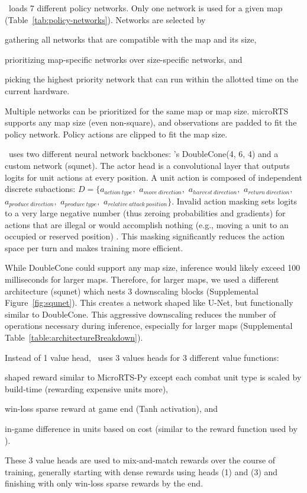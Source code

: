 \documentclass[conference]{IEEEtran}
\begin{document}
\agentName\ loads 7 different policy networks. Only one network is used
for a given map (Table~\ref{tab:policy-networks}). 
Networks are selected by
\begin{inparaenum}[(1)]
    \item gathering all networks that are compatible with the map and its size,
    \item prioritizing map-specific networks over size-specific networks, and
    \item picking the highest priority network that can run within the allotted time on
    the current hardware.
\end{inparaenum}
Multiple networks can be prioritized for the same map or map size. microRTS supports any
map size (even non-square), and 
observations are padded to fit the policy network. Policy actions are clipped to fit the
map size.

\agentName\ uses two different neural network backbones:
\cite{Ferdinand2021doublecone}'s DoubleCone(4, 6, 4) and a custom network
(squnet). The actor head is a convolutional layer
that outputs logits for unit actions at every position. A unit action is composed of
independent discrete subactions: $D = \{a_{action\ type},$ $a_{move\ direction},$ $a_{harvest\
direction},$ $a_{return\ direction},$ $a_{produce\ direction},$ $a_{produce\ type},$ $a_{relative\
attack\ position}\}$. Invalid action masking sets
logits to a very large negative number (thus zeroing probabilities and gradients) for actions that are
illegal or would accomplish nothing (e.g., moving a unit to an occupied or reserved
position) \cite{DBLP:journals/corr/abs-2006-14171}. This masking significantly reduces
the action space per turn and makes training more efficient.

While DoubleCone could support any map size, inference would likely exceed 100
milliseconds for larger maps. Therefore, for larger maps, we used a different
architecture (squnet) which nests 3 downscaling blocks (Supplemental Figure~\ref{fig:squnet}). This 
creates a network shaped like U-Net, but functionally similar to DoubleCone.
This aggressive downscaling reduces the number of operations necessary during inference,
especially for larger maps (Supplemental Table~\ref{table:architectureBreakdown}).

Instead of 1 value head, \agentName\ uses 3 values heads for 3 different value
functions:
\begin{inparaenum}[(1)]
    \item shaped reward similar to MicroRTS-Py except each combat unit type is
    scaled by build-time (rewarding expensive units more),
    \item win-loss sparse reward at game end (Tanh activation), and
    \item in-game difference in units based on cost (similar to the reward function used
    by \cite{Winter2021}).
\end{inparaenum}
These 3 value heads are used to mix-and-match rewards over the course of training,
generally starting with dense rewards using heads (1) and (3) and finishing with only
win-loss sparse rewards by the end.
\end{document}
